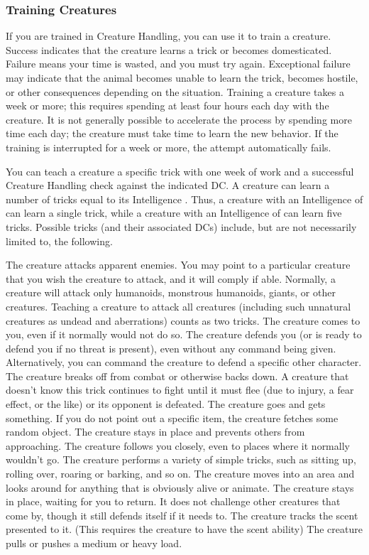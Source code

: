 \subsubsection{Training Creatures}
If you are trained in Creature Handling, you can use it to train a creature. Success indicates that the creature learns a trick or becomes domesticated. Failure means your time is wasted, and you must try again. Exceptional failure may indicate that the animal becomes unable to learn the trick, becomes hostile, or other consequences depending on the situation. Training a creature takes a week or more; this requires spending at least four hours each day with the creature. It is not generally possible to accelerate the process by spending more time each day; the creature must take time to learn the new behavior. If the training is interrupted for a week or more, the attempt automatically fails.

 You can teach a creature a specific trick with one week of work and a successful Creature Handling check against the indicated DC. A creature can learn a number of tricks equal to its Intelligence . Thus, a creature with an Intelligence of  can learn a single trick, while a creature with an Intelligence of  can learn five tricks. Possible tricks (and their associated DCs) include, but are not necessarily limited to, the following.

 The creature attacks apparent enemies. You may point to a particular creature that you wish the creature to attack, and it will comply if able. Normally, a creature will attack only humanoids, monstrous humanoids, giants, or other creatures. Teaching a creature to attack all creatures (including such unnatural creatures as undead and aberrations) counts as two tricks.
 The creature comes to you, even if it normally would not do so.
 The creature defends you (or is ready to defend you if no threat is present), even without any command being given. Alternatively, you can command the creature to defend a specific other character.
 The creature breaks off from combat or otherwise backs down. A creature that doesn't know this trick continues to fight until it must flee (due to injury, a fear effect, or the like) or its opponent is defeated.
 The creature goes and gets something. If you do not point out a specific item, the creature fetches some random object.
 The creature stays in place and prevents others from approaching.
 The creature follows you closely, even to places where it normally wouldn't go.
 The creature performs a variety of simple tricks, such as sitting up, rolling over, roaring or barking, and so on.
 The creature moves into an area and looks around for anything that is obviously alive or animate.
 The creature stays in place, waiting for you to return. It does not challenge other creatures that come by, though it still defends itself if it needs to.
 The creature tracks the scent presented to it. (This requires the creature to have the scent ability)
 The creature pulls or pushes a medium or heavy load.


